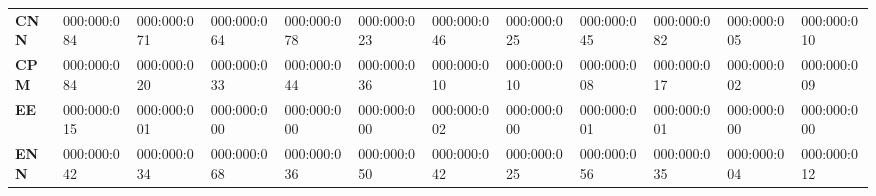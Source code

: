 {{\begin{tabular}{llllllllllll}
\textbf{CNN}                  & 000:000:084                                                                            & 000:000:071                                                                          & 000:000:064                         & 000:000:078                           & 000:000:023                                                                                      & 000:000:046                           & 000:000:025                           & 000:000:045                           & 000:000:082                            & 000:000:005                         & 000:000:010                                                                          \\
\textbf{CPM}                  & 000:000:084                                                                            & 000:000:020                                                                          & 000:000:033                         & 000:000:044                           & 000:000:036                                                                                      & 000:000:010                           & 000:000:010                           & 000:000:008                           & 000:000:017                            & 000:000:002                         & 000:000:009                                                                          \\
\textbf{EE}                   & 000:000:015                                                                            & 000:000:001                                                                          & 000:000:000                         & 000:000:000                           & 000:000:000                                                                                      & 000:000:002                           & 000:000:000                           & 000:000:001                           & 000:000:001                            & 000:000:000                         & 000:000:000                                                                          \\
\textbf{ENN}                  & 000:000:042                                                                            & 000:000:034                                                                          & 000:000:068                         & 000:000:036                           & 000:000:050                                                                                      & 000:000:042                           & 000:000:025                           & 000:000:056                           & 000:000:035                            & 000:000:004                         & 000:000:012                                                                          \\

\end{tabular}}}
